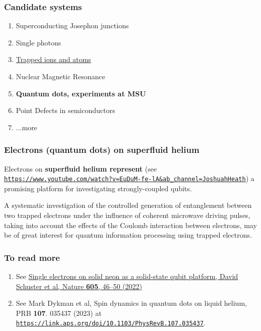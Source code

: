 \documentclass{beamer}
\begin{document}
\begin{frame}
\frametitle{Candidate systems}

\begin{block}{}
\begin{enumerate}
\item Superconducting Josephon junctions

\item Single photons

\item \href{{https://journals.aps.org/rmp/pdf/10.1103/RevModPhys.93.025001}}{Trapped ions and atoms}

\item Nuclear Magnetic Resonance

\item \textbf{Quantum dots, experiments at MSU}

\item Point Defects in semiconductors

\item ...more
\end{enumerate}

\noindent
\end{block}
\end{frame}

\begin{frame}
\frametitle{Electrons (quantum dots) on superfluid helium}

Electrons on \textbf{superfluid helium represent} (see \href{{https://www.youtube.com/watch?v=EuDuM-fe-lA&ab_channel=JoshuahHeath}}{\nolinkurl{https://www.youtube.com/watch?v=EuDuM-fe-lA&ab_channel=JoshuahHeath}}) a promising platform for investigating
strongly-coupled qubits.

A systematic investigation of the
controlled generation of entanglement between two trapped electrons
under the influence of coherent microwave driving pulses, taking into
account the effects of the Coulomb interaction between electrons, may be of great interest for quantum information processing using
trapped electrons.
\end{frame}

\begin{frame}
\frametitle{To read more}

\begin{enumerate}
\item See \href{{https://www.nature.com/articles/s41586-022-04539-x}}{Single electrons on solid neon as a solid-state qubit platform, David Schuster et al, Nature \textbf{605}, 46–50 (2022)}

\item See Mark Dykman et al, Spin dynamics in quantum dots on liquid helium, PRB \textbf{107}. 035437 (2023) at \href{{https://link.aps.org/doi/10.1103/PhysRevB.107.035437}}{\nolinkurl{https://link.aps.org/doi/10.1103/PhysRevB.107.035437}}.
\end{enumerate}

\noindent
\end{frame}
\end{document}
